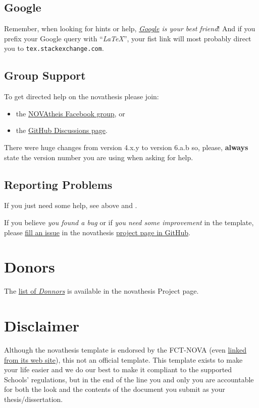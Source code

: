 \subsection{Google}
\label{sub:group_google}

Remember, when looking for hints or help, \emph{\href{google.com}{Google} is your best friend}!   And if you prefix your Google query with “\emph{LaTeX}”, your fist link will most probably direct you to \texttt{tex.stackexchange.com}.

\subsection{Group Support}
\label{sub:group_support}

To get directed help on the \gls{novathesis} please join:
\begin{itemize}
  \item the \href{https://www.facebook.com/groups/novathesis}{NOVAtheis Facebook group}, or
  \item the \href{https://github.com/joaomlourenco/novathesis/discussions}{GitHub Discussions page}.
\end{itemize}

There were huge changes from version 4.x.y to version 6.a.b so, please, \textbf{always} state the version number you are using when asking for help.

\subsection{Reporting Problems}
\label{sub:reporting_problems}

If you just need some help, see above  and .

If you believe \emph{you found a bug} or if \emph{you need some improvement} in the template, please \href{https://github.com/joaomlourenco/novathesis/issues}{fill an issue} in the \gls{novathesis} \href{https://github.com/joaomlourenco/novathesis/issues}{project page in GitHub}.


\section{Donors}
\label{sec:donations}

The \href{https://github.com/joaomlourenco/novathesis/wiki#donators}{list of \emph{Donnors}} is available in the \gls{novathesis} Project page.


\section{Disclaimer}
\label{sec:disclaimer}

Although the \gls{novathesis} template is endorsed by the FCT-NOVA (even \href{https://www.fct.unl.pt/estudante/informacao-academica}{linked from its web site}), this not an official template.
%
This template exists to make your life easier and we do our best to make it compliant to the supported Schools' regulations, but in the end of the line you and only you are accountable for both the look and the contents of the document you submit as your thesis/dissertation.

